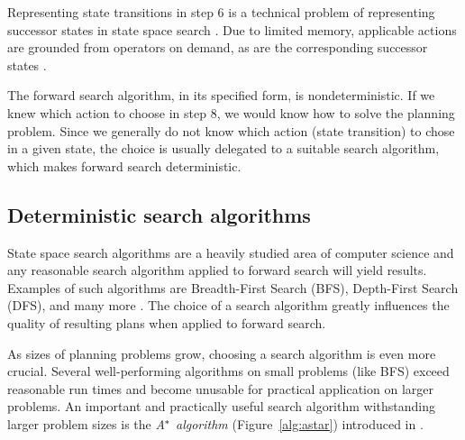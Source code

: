 Representing state transitions in step 6
is a technical problem of representing successor states
in state space search \citep[Section~3.2]{Russell1995}.
Due to limited memory,
applicable actions are grounded from operators
on demand, as are the corresponding successor states
\citep[Section~3.4]{Russell1995}.

The forward search algorithm, in its specified form, is nondeterministic.
If we knew which action to choose in step 8,
we would know how to solve the planning problem.
Since we generally do not know which action (state transition) to chose in a given state, the choice is usually delegated to a suitable
search algorithm, which makes forward search deterministic.


\subsection{Deterministic search algorithms}

State space search algorithms are a heavily studied area
of computer science and any reasonable search algorithm applied
to forward search will yield results.
Examples of such algorithms are Breadth-First Search (BFS),
Depth-First Search (DFS), and many more \citep[Section~3.5]{Russell1995}.
The choice of a search algorithm greatly influences
the quality of resulting plans when applied to forward search.

As sizes of planning problems grow,
choosing a search algorithm is even more crucial.
Several well-performing algorithms on small problems (like BFS)
exceed reasonable run times and become unusable for practical application on larger problems.
An important and practically useful search algorithm
withstanding larger problem sizes is the \textit{A$^{\kern-.05em*}$ algorithm} (Figure~\ref{alg:astar})
introduced in \citet{Hart1968}.

